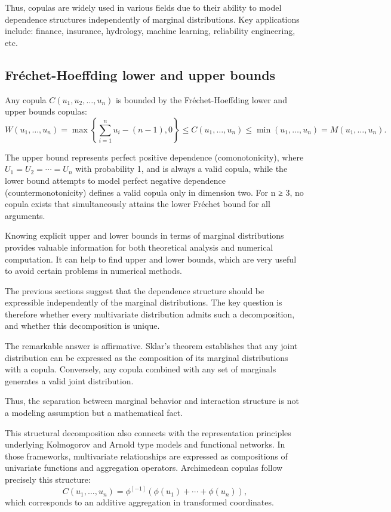 




Thus, copulas are widely used in various fields due to their ability to model dependence structures independently of marginal distributions. Key applications include: finance, insurance, hydrology, machine learning, reliability engineering, etc.

\subsection*{Fréchet-Hoeffding lower and upper bounds}
Any copula $C(u_1,u_2,\ldots,u_n)$ is bounded by the Fréchet-Hoeffding lower and upper bounds copulas:
\begin{equation}
W(u_1,\ldots,u_n) = \max\left\{\sum_{i=1}^n u_i - (n-1), 0\right\} \leq C(u_1,\ldots,u_n) \leq \min(u_1,\ldots,u_n) = M(u_1,\ldots,u_n).
\label{eq:frechetbounds}
\end{equation}

The upper bound represents perfect positive dependence (comonotonicity), where $U_1 = U_2 = \cdots = U_n$ with probability 1, and is always a valid copula, while the lower bound attempts to model perfect negative dependence (countermonotonicity) defines a valid copula only in dimension two. For n ≥ 3, no copula exists that simultaneously attains the lower Fréchet bound for all arguments.

Knowing explicit upper and lower bounds in terms of marginal distributions provides
valuable information for both theoretical analysis and numerical computation. It can help to find upper and lower bounds, which are very useful to avoid certain problems in numerical methods.

The previous sections suggest that the dependence structure should be expressible
independently of the marginal distributions. The key question is therefore whether
every multivariate distribution admits such a decomposition, and whether this
decomposition is unique.

The remarkable answer is affirmative. Sklar's theorem establishes that any joint
distribution can be expressed as the composition of its marginal distributions with a
copula. Conversely, any copula combined with any set of marginals generates a valid
joint distribution.

Thus, the separation between marginal behavior and interaction structure is not a
modeling assumption but a mathematical fact.

This structural decomposition also connects with the representation principles
underlying Kolmogorov and Arnold type models and functional networks. In those frameworks,
multivariate relationships are expressed as compositions of univariate functions and
aggregation operators. Archimedean copulas follow precisely this structure:
\[
C(u_1,\ldots,u_n) = \phi^{[-1]}(\phi(u_1)+\cdots+\phi(u_n)),
\]
which corresponds to an additive aggregation in transformed coordinates.

